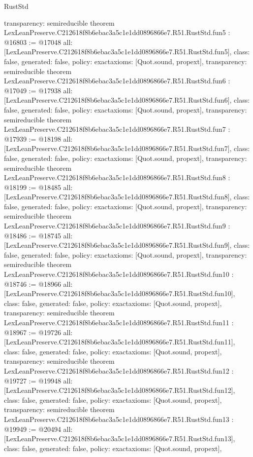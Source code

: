 \begin{lexlean}{RustStd}
\begin{coremodule}
{  transparency: semireducible
}
theorem LexLeanPreserve.C212618f8b6ebac3a5c1e1dd0896866e7.R51.RustStd.fun5 : @16803 := @17048 {
  all: [LexLeanPreserve.C212618f8b6ebac3a5c1e1dd0896866e7.R51.RustStd.fun5],
  class: false,
  generated: false,
  policy: exact{axioms: [Quot.sound, propext]},
  transparency: semireducible
}
theorem LexLeanPreserve.C212618f8b6ebac3a5c1e1dd0896866e7.R51.RustStd.fun6 : @17049 := @17938 {
  all: [LexLeanPreserve.C212618f8b6ebac3a5c1e1dd0896866e7.R51.RustStd.fun6],
  class: false,
  generated: false,
  policy: exact{axioms: [Quot.sound, propext]},
  transparency: semireducible
}
theorem LexLeanPreserve.C212618f8b6ebac3a5c1e1dd0896866e7.R51.RustStd.fun7 : @17939 := @18198 {
  all: [LexLeanPreserve.C212618f8b6ebac3a5c1e1dd0896866e7.R51.RustStd.fun7],
  class: false,
  generated: false,
  policy: exact{axioms: [Quot.sound, propext]},
  transparency: semireducible
}
theorem LexLeanPreserve.C212618f8b6ebac3a5c1e1dd0896866e7.R51.RustStd.fun8 : @18199 := @18485 {
  all: [LexLeanPreserve.C212618f8b6ebac3a5c1e1dd0896866e7.R51.RustStd.fun8],
  class: false,
  generated: false,
  policy: exact{axioms: [Quot.sound, propext]},
  transparency: semireducible
}
theorem LexLeanPreserve.C212618f8b6ebac3a5c1e1dd0896866e7.R51.RustStd.fun9 : @18486 := @18745 {
  all: [LexLeanPreserve.C212618f8b6ebac3a5c1e1dd0896866e7.R51.RustStd.fun9],
  class: false,
  generated: false,
  policy: exact{axioms: [Quot.sound, propext]},
  transparency: semireducible
}
theorem LexLeanPreserve.C212618f8b6ebac3a5c1e1dd0896866e7.R51.RustStd.fun10 : @18746 := @18966 {
  all: [LexLeanPreserve.C212618f8b6ebac3a5c1e1dd0896866e7.R51.RustStd.fun10],
  class: false,
  generated: false,
  policy: exact{axioms: [Quot.sound, propext]},
  transparency: semireducible
}
theorem LexLeanPreserve.C212618f8b6ebac3a5c1e1dd0896866e7.R51.RustStd.fun11 : @18967 := @19726 {
  all: [LexLeanPreserve.C212618f8b6ebac3a5c1e1dd0896866e7.R51.RustStd.fun11],
  class: false,
  generated: false,
  policy: exact{axioms: [Quot.sound, propext]},
  transparency: semireducible
}
theorem LexLeanPreserve.C212618f8b6ebac3a5c1e1dd0896866e7.R51.RustStd.fun12 : @19727 := @19948 {
  all: [LexLeanPreserve.C212618f8b6ebac3a5c1e1dd0896866e7.R51.RustStd.fun12],
  class: false,
  generated: false,
  policy: exact{axioms: [Quot.sound, propext]},
  transparency: semireducible
}
theorem LexLeanPreserve.C212618f8b6ebac3a5c1e1dd0896866e7.R51.RustStd.fun13 : @19949 := @20494 {
  all: [LexLeanPreserve.C212618f8b6ebac3a5c1e1dd0896866e7.R51.RustStd.fun13],
  class: false,
  generated: false,
  policy: exact{axioms: [Quot.sound, propext]},
}
\end{coremodule}
\end{lexlean}
